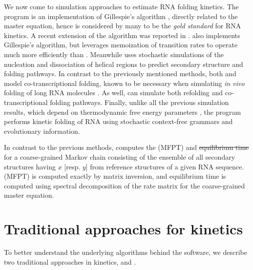 \documentclass[11pt, oneside]{Thesis} %
\providecommand{\DIFdel}[1]{{\protect\color{red}\sout{#1}}}                      %
\providecommand{\DIFaddbegin}{} %
\providecommand{\DIFaddend}{} %
\providecommand{\DIFdelbegin}{} %
\providecommand{\DIFdelend}{} %
\begin{document}
We now come to simulation approaches to estimate RNA folding kinetics.
The program \kinfold \citep{flammphd,flamm} is an implementation
of Gillespie's algorithm \citep{gillespiestochasticsimulation1},
directly related to the master equation, hence is considered by many
to be the {\em gold standard} for RNA kinetics. A recent extension of the
\kinfold algorithm was reported in \citep{aviram.amb12}.
 \citep{dykeman:2015bxa} also implements Gillespie's algorithm,
but leverages memoization of transition rates to operate much more efficiently
than \kinfold. Meanwhile  \citep{xayaphoummine.nar05} uses
stochastic simulations of
the nucleation and dissociation of helical regions to predict
secondary structure and folding pathways. In contrast to the
previously mentioned methods, both 
\citep{danilova.jbcb06} and  \citep{geis.jmb08} model
co-transcriptional folding, known to be necessary when simulating
{\em in vivo} folding of long RNA molecules \citep{lai.r13}. As well,
 can simulate both refolding and co-transcriptional folding
pathways. Finally, unlike all the previous simulation results, which
depend on thermodynamic free energy parameters \citep{turner.nar10},
the program  \citep{anderson.b13} performs kinetic folding
of RNA using stochastic context-free grammars and evolutionary
information.

In contrast to the previous methods, \hermes computes the \mfpt (MFPT)
and \DIFdelbegin %
\DIFdel{equilibrium time}%
\DIFdelend \DIFaddbegin \eqt \DIFaddend for a
coarse-grained Markov chain consisting of the ensemble of all
secondary structures having \bpd $x$ [resp. $y$] from
reference structures  of a given RNA sequence.
\Mfpt (MFPT) is computed exactly by matrix inversion,
and equilibrium time is computed using spectral decomposition of the rate
matrix for the coarse-grained master equation.

\section{Traditional approaches for kinetics}
\label{sec:hermes:kinetics}

To better understand the underlying algorithms behind the software,
we describe two traditional approaches in kinetics, \mfpt and \eqt.

\subsection{\Mfpt}
\label{subsec:hermes:mfpt}
\end{document}
